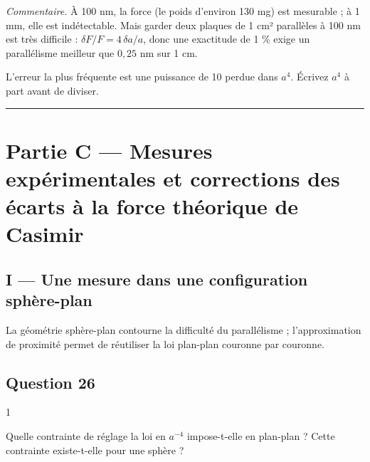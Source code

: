 \documentclass[11pt,a4paper]{article}
\begin{document}
\emph{Commentaire.} À 100 nm, la force (le poids d'environ 130 mg) est mesurable ; à 1 mm, elle est indétectable. Mais garder deux plaques de 1 cm² parallèles à 100 nm est très difficile : \(\delta F/F=4\,\delta a/a\), donc une exactitude de 1 \% exige un parallélisme meilleur que \(0{,}25\) nm sur 1 cm.

\begin{piege}

L'erreur la plus fréquente est une puissance de 10 perdue dans \(a^4\). Écrivez \(a^4\) à part avant de diviser.

\end{piege}

\begin{center}\rule{0.5\linewidth}{0.5pt}\end{center}

\hypertarget{partie-c-mesures-expuxe9rimentales-et-corrections-des-uxe9carts-uxe0-la-force-thuxe9orique-de-casimir}{%
\section{Partie C --- Mesures expérimentales et corrections des écarts à la force théorique de Casimir}\label{partie-c-mesures-expuxe9rimentales-et-corrections-des-uxe9carts-uxe0-la-force-thuxe9orique-de-casimir}}

\hypertarget{i-une-mesure-dans-une-configuration-sphuxe8re-plan}{%
\subsection{I --- Une mesure dans une configuration sphère-plan}\label{i-une-mesure-dans-une-configuration-sphuxe8re-plan}}

La géométrie sphère-plan contourne la difficulté du parallélisme ; l'approximation de proximité permet de réutiliser la loi plan-plan couronne par couronne.

\hypertarget{question-26}{%
\subsection{Question 26}\label{question-26}}

\begin{indication}{1}

Quelle contrainte de réglage la loi en \(a^{-4}\) impose-t-elle en plan-plan ? Cette contrainte existe-t-elle pour une sphère ?

\end{indication}
\end{document}
